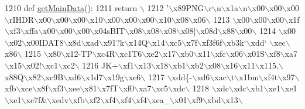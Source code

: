 \begin{DoxyCode}
1210 \textcolor{keyword}{def }\hyperlink{namespaceimages_a67ab05f76d8ee82ee207e9313f1452b1}{getMainData}():
1211     \textcolor{keywordflow}{return} \(\backslash\)
1212 \textcolor{stringliteral}{'\(\backslash\)x89PNG\(\backslash\)r\(\backslash\)n\(\backslash\)x1a\(\backslash\)n\(\backslash\)x00\(\backslash\)x00\(\backslash\)x00\(\backslash\)rIHDR\(\backslash\)x00\(\backslash\)x00\(\backslash\)x00\(\backslash\)x10\(\backslash\)x00\(\backslash\)x00\(\backslash\)x00\(\backslash\)x10\(\backslash\)x08\(\backslash\)x06\(\backslash\)}
1213 \textcolor{stringliteral}{\(\backslash\)x00\(\backslash\)x00\(\backslash\)x00\(\backslash\)x1f\(\backslash\)xf3\(\backslash\)xffa\(\backslash\)x00\(\backslash\)x00\(\backslash\)x00\(\backslash\)x04sBIT\(\backslash\)x08\(\backslash\)x08\(\backslash\)x08\(\backslash\)x08|\(\backslash\)x08d\(\backslash\)x88\(\backslash\)x00\(\backslash\)}
1214 \textcolor{stringliteral}{\(\backslash\)x00\(\backslash\)x02\(\backslash\)x00IDAT8\(\backslash\)x8d\(\backslash\)xad\(\backslash\)x91?k\(\backslash\)x14Q\(\backslash\)x14\(\backslash\)xc5\(\backslash\)x7f\(\backslash\)xf3f6f\(\backslash\)xb3k`\(\backslash\)xdd` \(\backslash\)xec\(\backslash\)x86\(\backslash\)}
1215 \textcolor{stringliteral}{\(\backslash\)x80\(\backslash\)x12-TP\(\backslash\)xc4R\(\backslash\)xc1T6\(\backslash\)xe2\(\backslash\)x17\(\backslash\)xb0\(\backslash\)x11\(\backslash\)xfc\(\backslash\)x06\(\backslash\)x01S\(\backslash\)xf8\(\backslash\)xa7\(\backslash\)x15\(\backslash\)x02!\(\backslash\)xc1\(\backslash\)xc2\(\backslash\)}
1216 \textcolor{stringliteral}{JK+\(\backslash\)xf1\(\backslash\)x13\(\backslash\)x18\(\backslash\)xb1\(\backslash\)xb2\(\backslash\)x08\(\backslash\)x16\(\backslash\)x11\(\backslash\)x115.\(\backslash\)x88Q\(\backslash\)x82\(\backslash\)xc9B\(\backslash\)xd6\(\backslash\)x1d7\(\backslash\)x19g\(\backslash\)xe6\(\backslash\)}
1217 \textcolor{stringliteral}{\(\backslash\)xdd\{-\(\backslash\)xd6\(\backslash\)xac\(\backslash\)t\(\backslash\)x1bm\(\backslash\)xf4t\(\backslash\)x97\(\backslash\)xfb\(\backslash\)xce\(\backslash\)x8f\(\backslash\)xf3\(\backslash\)xee\(\backslash\)x81\(\backslash\)x7fT\(\backslash\)xf0\(\backslash\)xa7\(\backslash\)xc5\(\backslash\)xdc\(\backslash\)}
1218 \textcolor{stringliteral}{\(\backslash\)xdc\(\backslash\)xdc\(\backslash\)xb1\(\backslash\)xe1\(\backslash\)xe1\(\backslash\)xe1\(\backslash\)xc7f&\(\backslash\)xedv\(\backslash\)xfb\(\backslash\)xf2\(\backslash\)xf4\(\backslash\)xf4\(\backslash\)xf4\(\backslash\)xea\_\(\backslash\)x01\(\backslash\)xf9\(\backslash\)xbd\(\backslash\)x13\(\backslash\)}

\end{DoxyCode}
